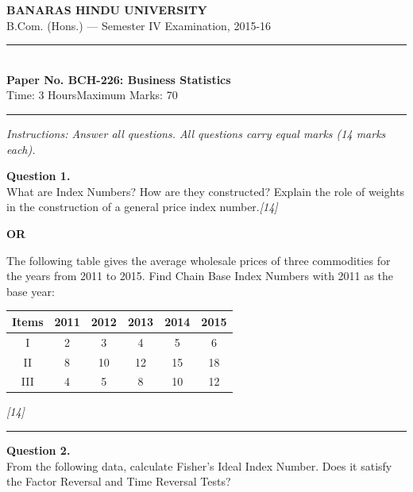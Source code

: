\documentclass[11pt,a4paper]{article}
\newcommand{\pts}[1]{\hfill   \textit{[#1]}}
\begin{document}
\begin{center}
  {\large\bfseries BANARAS HINDU UNIVERSITY}\\[2pt]
  {\normalsize B.Com. (Hons.) --- Semester IV Examination, 2015-16}\\[6pt]
  \rule{0.8\linewidth}{0.5pt}\\[6pt]
  {\large\bfseries Paper No. BCH-226: Business Statistics}\\[4pt]
  {\normalsize Time: 3 Hours\hfill Maximum Marks: 70}
\end{center}

\rule{\linewidth}{0.4pt}

\smallskip



\noindent   \textit{Instructions: Answer all questions. All questions carry equal marks (14 marks each).}

\bigskip




\noindent   \textbf{Question 1.} \\
What are Index Numbers? How are they constructed? Explain the role of weights in the construction of a general price index number.\pts{14}

\centerline{   \textbf{OR}}

The following table gives the average wholesale prices of three commodities for the years from 2011 to 2015. Find Chain Base Index Numbers with 2011 as the base year:


\begin{center}
\small

\begin{tabular}{|c|c|c|c|c|c|}
\hline
   \textbf{Items} &   \textbf{2011} &   \textbf{2012} &   \textbf{2013} &   \textbf{2014} &   \textbf{2015} \\
\hline
I & 2 & 3 & 4 & 5 & 6 \\
II & 8 & 10 & 12 & 15 & 18 \\
III & 4 & 5 & 8 & 10 & 12 \\
\hline
\end{tabular}
\end{center}\pts{14}

\medskip\rule{\linewidth}{0.2pt}

\pagebreak




\noindent   \textbf{Question 2.} \\
From the following data, calculate Fisher's Ideal Index Number. Does it satisfy the Factor Reversal and Time Reversal Tests?
\end{document}
